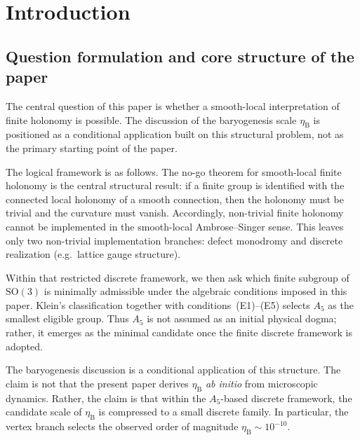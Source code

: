\documentclass[sn-mathphys-num,Numbered]{sn-jnl}
\theoremstyle{thmstyleone}
\theoremstyle{thmstylethree}
\theoremstyle{thmstyletwo}
\newcommand{\SO}{\mathrm{SO}}
\newcommand{\etaB}{\eta_{\mathrm{B}}}
\begin{document}
\tableofcontents

\section{Introduction}
\label{sec:intro}

\subsection{Question formulation and core structure of the paper}
\label{ssec:question}

The central question of this paper is whether a smooth-local
interpretation of finite holonomy is possible. The discussion of the
baryogenesis scale $\etaB$ is positioned as a conditional application
built on this structural problem, not as the primary starting point of
the paper.

The logical framework is as follows. The no-go theorem for smooth-local
finite holonomy is the central structural result: if a finite group is
identified with the connected local holonomy of a smooth connection,
then the holonomy must be trivial and the curvature must vanish.
Accordingly, non-trivial finite holonomy cannot be implemented in the
smooth-local Ambrose--Singer sense. This leaves only two non-trivial
implementation branches: defect monodromy and discrete realization
(e.g.\ lattice gauge structure).

Within that restricted discrete framework, we then ask which finite
subgroup of $\SO(3)$ is minimally admissible under the algebraic
conditions imposed in this paper. Klein's classification together with
conditions~(E1)--(E5) selects $A_5$ as the smallest eligible group.
Thus $A_5$ is not assumed as an initial physical dogma; rather, it
emerges as the minimal candidate once the finite discrete framework is
adopted.

The baryogenesis discussion is a conditional application of this
structure. The claim is not that the present paper derives $\etaB$
\emph{ab initio} from microscopic dynamics. Rather, the claim is that
within the $A_5$-based discrete framework, the candidate scale of
$\etaB$ is compressed to a small discrete family. In particular, the
vertex branch selects the observed order of magnitude
$\etaB\sim10^{-10}$.
\end{document}
